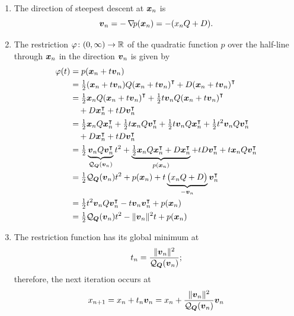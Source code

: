 \begin{enumerate}
	\item The direction of steepest descent at $\boldsymbol{x}_n$ is 
	\begin{equation*}\boldsymbol{v}_n = -\mathop{\nabla\! {p}}(\boldsymbol{x}_n) = -(x_n Q + D).
	\end{equation*}
	\item The restriction $\varphi\colon (0,\infty) \to \mathbb{R}$ of the quadratic function $p$ over the half-line through $\boldsymbol{x}_n$ in the direction $\boldsymbol{v}_n$ is given by
	\begin{align*}
	\varphi(t) &= p( \boldsymbol{x}_n + t \boldsymbol{v}_n ) \\
	&= \tfrac{1}{2}(\boldsymbol{x}_n + t\boldsymbol{v}_n ) Q {(\boldsymbol{x}_n + t\boldsymbol{v}_n )}^\intercal + D{(\boldsymbol{x}_n + t\boldsymbol{v}_n )}^\intercal \\
	&= \tfrac{1}{2} \boldsymbol{x}_n Q {(\boldsymbol{x}_n + t\boldsymbol{v}_n )}^\intercal + \tfrac{1}{2}t\boldsymbol{v}_n Q {(\boldsymbol{x}_n + t\boldsymbol{v}_n )}^\intercal \\
	&\quad+D {\boldsymbol{x}}^\intercal_n + tD {\boldsymbol{v}}^\intercal_n \\
	&= \tfrac{1}{2}\boldsymbol{x}_n Q {\boldsymbol{x}}^\intercal_n + \tfrac{1}{2} t\boldsymbol{x}_n Q {\boldsymbol{v}}^\intercal_n + \tfrac{1}{2} t \boldsymbol{v}_n Q {\boldsymbol{x}}^\intercal_n + \tfrac{1}{2} t^2 \boldsymbol{v}_n Q {\boldsymbol{v}}^\intercal_n \\
	&\quad + D {\boldsymbol{x}}^\intercal_n + t D {\boldsymbol{v}}^\intercal_n \\
	&= \tfrac{1}{2} \underbrace{\boldsymbol{v}_n Q {\boldsymbol{v}}^\intercal_n}_{\mathcal{Q}_{\boldsymbol{Q}}(\boldsymbol{v}_n)} t^2 + \underbrace{\tfrac{1}{2}\boldsymbol{x}_n Q {\boldsymbol{x}}^\intercal_n + D {\boldsymbol{x}}^\intercal_n}_{p(\boldsymbol{x}_n)} + tD{\boldsymbol{v}}^\intercal_n + t \boldsymbol{x}_n Q {\boldsymbol{v}}^\intercal_n \\
	&= \tfrac{1}{2} \mathcal{Q}_{\boldsymbol{Q}}(\boldsymbol{v}_n) t^2  + p(\boldsymbol{x}_n) + t \underbrace{\big( x_n Q + D \big)}_{-\boldsymbol{v}_n} {\boldsymbol{v}}^\intercal_n \\
	&= \tfrac{1}{2}t^2 \boldsymbol{v}_n Q {\boldsymbol{v}}^\intercal_n -  t \boldsymbol{v}_n {\boldsymbol{v}}^\intercal_n + p(\boldsymbol{x}_n) \\
	&= \tfrac{1}{2} \mathcal{Q}_{\boldsymbol{Q}}(\boldsymbol{v}_n)t^2 - \lVert \boldsymbol{v}_n \rVert^2 t + p(\boldsymbol{x}_n)
	\end{align*}
	\item The restriction function has its global minimum at
	\begin{equation*}
	t_n = \frac{\lVert \boldsymbol{v}_n \rVert^2}{\mathcal{Q}_{\boldsymbol{Q}}(\boldsymbol{v}_n)};
	\end{equation*}
	therefore, the next iteration occurs at
	\begin{equation*}
	x_{n+1} = x_n + t_n \boldsymbol{v}_n = x_n + \frac{\lVert \boldsymbol{v}_n \rVert^2}{\mathcal{Q}_{\boldsymbol{Q}}(\boldsymbol{v}_n)} \boldsymbol{v}_n 
	\end{equation*}
\end{enumerate}

\separator

